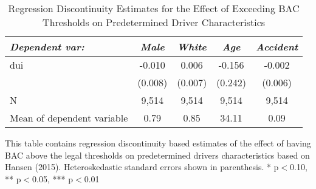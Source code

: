 \begin{table}[htbp]\centering
\small
\caption{Regression Discontinuity Estimates for the Effect of Exceeding BAC Thresholds on Predetermined Driver Characteristics}
\begin{center}
\begin{threeparttable}
\begin{tabular}{l*{4}{c}}
\toprule
\multicolumn{1}{l}{\textit{Dependent var: }}&
\multicolumn{1}{c}{\textit{Male}}&
\multicolumn{1}{c}{\textit{White}}&
\multicolumn{1}{c}{\textit{Age}}&
\multicolumn{1}{c}{\textit{Accident}}\\
\midrule
dui                 &      -0.010   &       0.006   &      -0.156   &      -0.002   \\
                    &     (0.008)   &     (0.007)   &     (0.242)   &     (0.006)   \\
\midrule
N                   &       9,514   &       9,514   &       9,514   &       9,514   \\
Mean of dependent variable&        0.79   &        0.85   &       34.11   &        0.09   \\
\bottomrule
\end{tabular}
\begin{tablenotes}
\tiny
\item This table contains regression discontinuity based estimates of the effect of having BAC above the legal thresholds on predetermined  drivers characteristics based on Hansen (2015).  Heteroskedastic standard errors shown in parenthesis.  * p$<$0.10, ** p$<$0.05, *** p$<$0.01
\end{tablenotes}
\end{threeparttable}
\end{center}
\end{table}
